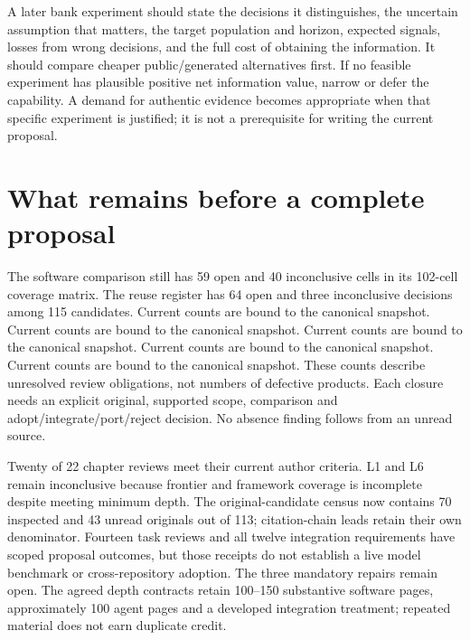 A later bank experiment should state the decisions it distinguishes, the
uncertain assumption that matters, the target population and horizon,
expected signals, losses from wrong decisions, and the full cost of
obtaining the information. It should compare cheaper public/generated
alternatives first. If no feasible experiment has plausible positive net
information value, narrow or defer the capability. A demand for
authentic evidence becomes appropriate when that specific experiment is
justified; it is not a prerequisite for writing the current proposal.

\hypertarget{what-remains-before-a-complete-proposal}{%
\section{What remains before a complete
proposal}\label{what-remains-before-a-complete-proposal}}

The software comparison still has 59 open and 40 inconclusive cells in
its 102-cell coverage matrix. The reuse register has 64 open and three
inconclusive decisions among 115 candidates. Current counts are bound to
the canonical snapshot. \citep{sp23tg_progress} Current counts are bound
to the canonical snapshot. \citep{sp23panel_progress} Current counts are
bound to the canonical snapshot. \citep{sp23otheriv_progress} Current
counts are bound to the canonical snapshot.
\citep{sp23admission_progress} Current counts are bound to the canonical
snapshot. \citep{sp23proof_progress} These counts describe unresolved
review obligations, not numbers of defective products. Each closure
needs an explicit original, supported scope, comparison and
adopt/integrate/port/reject decision. No absence finding follows from an
unread source.
\citep{sp23nt_progress,sp23lt_progress,sp23dw_progress,sp23sm_progress,sp22wf_progress,sp22ft_progress,sp22si_progress,sp22ob_progress,sp22dk_progress,sp22iv_progress,sp22bs_progress,sp21rr_progress,sp21pr_progress,sp21gs_progress,sp21eo_progress,sp21tr_progress,sp21ae_progress,sp21gr_progress,sp21ck_progress,sp21cx_progress,sp20md_progress,sp20gf_progress,sp20hy_progress,sp20je_progress,sp20nc_progress,sp20gc_progress,sp20ea_progress,sp20vm_progress,sp20pye_progress,sp20fx_progress,sp20pa_progress,sp20rfx_progress}

Twenty of 22 chapter reviews meet their current author criteria. L1 and
L6 remain inconclusive because frontier and framework coverage is
incomplete despite meeting minimum depth. The original-candidate census
now contains 70 inspected and 43 unread originals out of 113;
citation-chain leads retain their own denominator. Fourteen task reviews
and all twelve integration requirements have scoped proposal outcomes,
but those receipts do not establish a live model benchmark or
cross-repository adoption. The three mandatory repairs remain open. The
agreed depth contracts retain 100--150 substantive software pages,
approximately 100 agent pages and a developed integration treatment;
repeated material does not earn duplicate credit.
\citep{sp23nt_progress,sp19ec_census,sp18ar_census,sp18f_census,sp13_scope}

